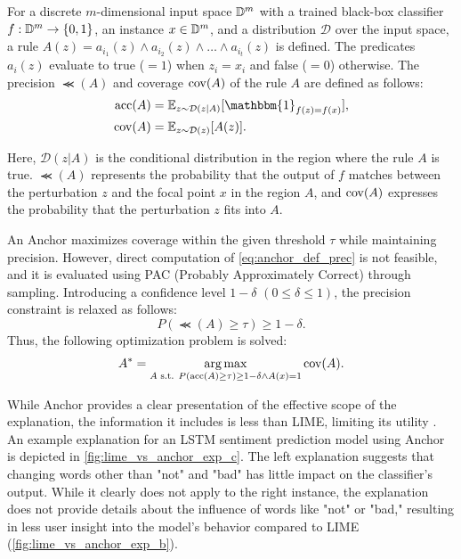 \documentclass[runningheads]{llncs}
\begin{document}
For a discrete $m$-dimensional input space $\mathbb{D}^{m}$ with a trained black-box classifier $f: \mathbb{D}^{m} \to \{0,1\}$, an instance $x \in \mathbb{D}^{m}$, and a distribution $\mathcal{D}$ over the input space, a rule $A(z) = a_{i_1}(z) \wedge a_{i_2}(z) \wedge \dots \wedge a_{i_t}(z)$ is defined. The predicates $a_i(z)$ evaluate to true ($=1$) when $z_i = x_i$ and false ($=0$) otherwise. The precision $\Prec(A)$ and coverage $\operatorname{cov}(A)$ of the rule $A$ are defined as follows:
\begin{align}
  \Prec(A) & =\mathbb{E}_{z\sim\mathcal{D}(z|A)}
  [\mathbbm{1}_{f(z)=f(x)}], \label{eq:anchor_def_prec} \\
  \Cov(A)  & =\mathbb{E}_{z\sim\mathcal{D}(z)}[A(z)].
\end{align}

Here, $\mathcal{D}(z|A)$ is the conditional distribution in the region where the rule $A$ is true.
$\Prec(A)$ represents the probability that the output of $f$ matches between the perturbation $z$ and the focal point $x$ in the region $A$, and $\operatorname{cov}(A)$ expresses the probability that the perturbation $z$ fits into $A$.

An Anchor maximizes coverage within the given threshold $\tau$ while maintaining precision.
However, direct computation of \cref{eq:anchor_def_prec} is not feasible, and it is evaluated using PAC (Probably Approximately Correct) through sampling.
Introducing a confidence level $1-\delta$ $(0\le\delta\le1)$, the precision constraint is relaxed as follows:
\begin{equation}
  \label{eq:const_prec}
  P(\Prec(A)\ge\tau)\ge1-\delta.
\end{equation}
Thus, the following optimization problem is solved:
\begin{equation}
  \label{eq:main_problem}
  A^*=\underset{A \text{ s.t. } P(\operatorname{acc}(A)\ge\tau)\ge1-\delta\wedge A(x)=1}
  {\arg\max}\operatorname{cov}(A).
\end{equation}

While Anchor provides a clear presentation of the effective scope of the explanation, the information it includes is less than LIME, limiting its utility \cite{ribeiro2018anchors}. An example explanation for an LSTM sentiment prediction model using Anchor is depicted in \cref{fig:lime_vs_anchor_exp_c}. The left explanation suggests that changing words other than "not" and "bad" has little impact on the classifier's output. While it clearly does not apply to the right instance, the explanation does not provide details about the influence of words like "not" or "bad," resulting in less user insight into the model's behavior compared to LIME (\cref{fig:lime_vs_anchor_exp_b}).
\end{document}
